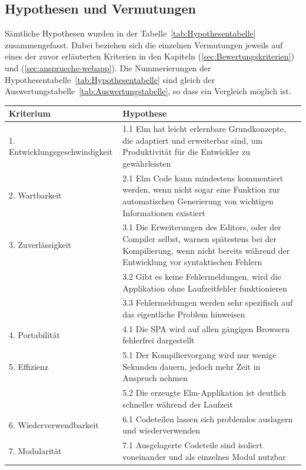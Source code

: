 \subsection{Hypothesen und Vermutungen}
\label{sec:Hypothesen und Vermutungen}
Sämtliche Hypothesen wurden in der Tabelle~\ref{tab:Hypothesentabelle} zusammengefasst. Dabei beziehen sich die einzelnen Vermutungen jeweils auf eines der zuvor erläuterten Kriterien in den Kapiteln  (\ref{sec:Bewertungskriterien}) und  (\ref{sec:ansprueche-webapp}). Die Nummerierungen der Hypothesentabelle~\ref{tab:Hypothesentabelle} sind gleich der Auswertungstabelle~\ref{tab:Auswertungstabelle}, so dass ein Vergleich möglich ist.
\begin{table}[p]
\begin{tabular}{ | l | p{7.6cm} | }
	\hline
	\textbf{Kriterium} &\textbf{Hypothese}\\
	\hline
	1. Entwicklungsgeschwindigkeit & 1.1 Elm hat leicht erlernbare Grundkonzepte, die adaptiert und erweiterbar sind, um Produktivität für die Entwickler zu gewährleisten\\
	\hline
	2. Wartbarkeit & 2.1 Elm Code kann mindestens kommentiert werden, wenn nicht sogar eine Funktion zur automatischen Generierung von wichtigen Informationen existiert\\
	\hline
	3. Zuverlässigkeit & 3.1 Die Erweiterungen des Editors, oder der Compiler selbst, warnen spätestens bei der Kompilierung, wenn nicht bereits während der Entwicklung vor syntaktischen Fehlern\\
	& 3.2  Gibt es keine Fehlermeldungen, wird die Applikation ohne Laufzeitfehler funktionieren\\
	& 3.3  Fehlermeldungen werden sehr spezifisch auf das eigentliche Problem hinweisen\\
	\hline
	4. Portabilität &  4.1 Die \ac{SPA} wird auf allen gängigen Browsern fehlerfrei dargestellt\\
	\hline
	5. Effizienz & 5.1 Der Kompiliervorgang wird nur wenige Sekunden dauern, jedoch mehr Zeit in Anspruch nehmen\\
	&  5.2 Die erzeugte Elm-Applikation ist deutlich schneller während der Laufzeit\\
	\hline
	6. Wiederverwendbarkeit & 6.1 Codeteilen lassen sich problemlos auslagern und wiederverwenden\\
	\hline
	7. Modularität & 7.1 Ausgelagerte Codeteile sind isoliert voneinander und als einzelnes Modul nutzbar\\

\end{tabular}
\end{table}
